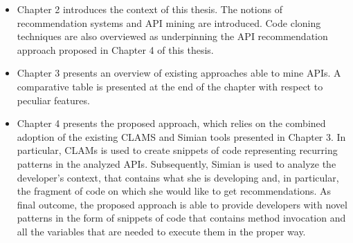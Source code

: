 \begin{itemize}
	\item Chapter 2 introduces the context of this thesis. The notions of 
	recommendation systems and API mining are introduced. Code cloning 
	techniques are also overviewed as underpinning the API recommendation 
	approach proposed in Chapter 4 of this thesis.
		
	
	\item Chapter 3 presents an overview of existing approaches able to mine 
	APIs. A comparative table is presented at the end of the chapter with 
	respect to peculiar features.
	
	
	\item Chapter 4 presents the proposed approach, which relies on the combined
	adoption of the existing CLAMS and Simian tools presented in Chapter 3. In 
	particular, CLAMs is used to create snippets of code representing recurring 
	patterns in the analyzed APIs. Subsequently, Simian is used to analyze the 
	developer's context, that contains what she is developing and, in 
	particular, the fragment of code on which she would like to get 
	recommendations. As final outcome, the proposed approach is able to provide 
	developers with novel patterns in the form of snippets of code that 
	contains method invocation and all the variables that are needed to execute 
	them in the proper way.
	

\end{itemize}
